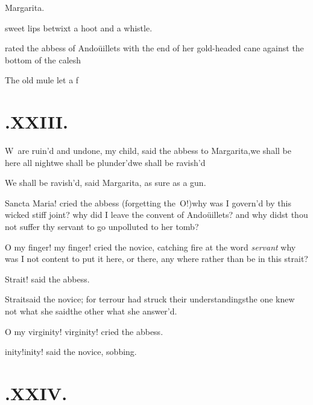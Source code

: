 \documentclass{article}
\begin{document}
\noindent
{}\break
Margarita.

\noindent
{}

\noindent
{}\break
{}
sweet lips betwixt a hoot and a whistle.

\noindent
{}\break
rated the abbess of Andoüillets with the end of her gold-headed
cane against the bottom of the calesh\tsh

\tsh The old mule let a f\tsk

\newpage
\section{.\enspace XXIII.}

\lettrine{W}{\,} are ruin’d and undone, my\break
child, said the abbess to Margarita,\tsh we shall
be here all night\tsh we shall be
plunder’d\tsh we shall be ravish’d\tsh

\tsh We shall be ravish’d, said Margarita,
as sure as a gun.

Sancta Maria! cried the abbess (forgetting the~O!)\tsk why was I govern’d by this
wicked stiff joint? why did I leave the convent of
Andoüillets? and why didst thou not suffer thy servant
to go unpolluted to her tomb?

O my finger! my finger! cried the novice, catching fire at the
word \textit{servant}\pb
\tsk why was I not content to put it here, or
there, any where rather than be in this strait?

\tsh Strait! said the abbess.

Strait\tsh said the novice; for terrour had struck their
understandings\tsh the one knew not what she
said\tsh the other what she answer’d.

O my virginity! virginity! cried the abbess.

\tsh inity!\tsh inity! said the novice,
sobbing.

\newpage\null\smallskip

\section{.\enspace XXIV.}
\end{document}
